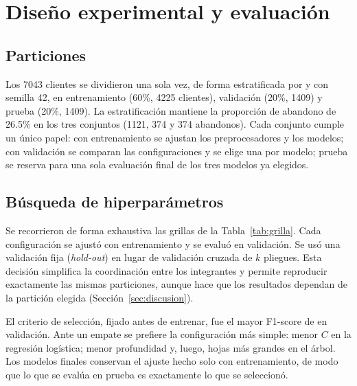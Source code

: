 \section{Diseño experimental y evaluación}
\label{sec:diseno}

\subsection{Particiones}
Los 7043 clientes se dividieron una sola vez, de forma estratificada por  y con semilla 42,
en entrenamiento (60\%, 4225 clientes), validación (20\%, 1409) y prueba (20\%, 1409). La
estratificación mantiene la proporción de abandono de 26.5\% en los tres conjuntos (1121, 374 y 374
abandonos). Cada conjunto cumple un único papel: con entrenamiento se ajustan los preprocesadores y
los modelos; con validación se comparan las configuraciones y se elige una por modelo; prueba se
reserva para una sola evaluación final de los tres modelos ya elegidos.

\subsection{Búsqueda de hiperparámetros}
Se recorrieron de forma exhaustiva las grillas de la Tabla~\ref{tab:grilla}. Cada configuración se
ajustó con entrenamiento y se evaluó en validación. Se usó una validación fija (\emph{hold-out}) en
lugar de validación cruzada de $k$ pliegues. Esta decisión simplifica la coordinación entre los
integrantes y permite reproducir exactamente las mismas particiones, aunque hace que los resultados
dependan de la partición elegida (Sección~\ref{sec:discusion}).

El criterio de selección, fijado antes de entrenar, fue el mayor F1-score de  en
validación. Ante un empate se prefiere la configuración más simple: menor $C$ en la regresión
logística; menor profundidad y, luego, hojas más grandes en el árbol. Los modelos finales conservan
el ajuste hecho solo con entrenamiento, de modo que lo que se evalúa en prueba es exactamente lo que
se seleccionó.

